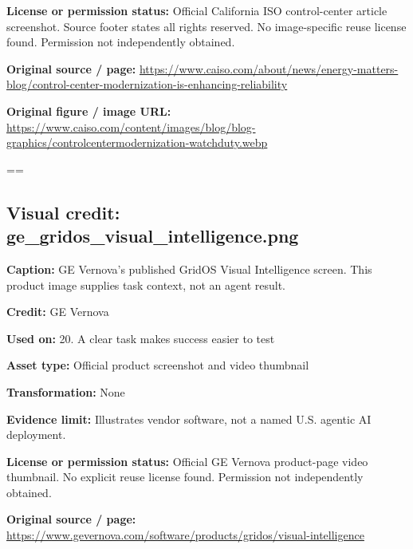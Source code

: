 \documentclass[10pt,letterpaper]{article}
\begin{document}
\textbf{License or permission status:} Official California ISO control-center article screenshot. Source footer states all rights reserved. No image-specific reuse license found. Permission not independently obtained.\par
\textbf{Original source / page:} \href{https://www.caiso.com/about/news/energy-matters-blog/control-center-modernization-is-enhancing-reliability}{\small\ttfamily https:/\allowbreak{}/\allowbreak{}www.\allowbreak{}caiso.\allowbreak{}com/\allowbreak{}about/\allowbreak{}news/\allowbreak{}energy-\allowbreak{}matters-\allowbreak{}blog/\allowbreak{}control-\allowbreak{}center-\allowbreak{}modernization-\allowbreak{}is-\allowbreak{}enhancing-\allowbreak{}reliability}\par
\textbf{Original figure / image URL:} \href{https://www.caiso.com/content/images/blog/blog-graphics/controlcentermodernization-watchduty.webp}{\small\ttfamily https:/\allowbreak{}/\allowbreak{}www.\allowbreak{}caiso.\allowbreak{}com/\allowbreak{}content/\allowbreak{}images/\allowbreak{}blog/\allowbreak{}blog-\allowbreak{}graphics/\allowbreak{}controlcentermodernization-\allowbreak{}watchduty.\allowbreak{}webp}\par
\egroup\par\noindent\box\readingEntry\par\medskip
\setbox\readingEntry=\vbox\bgroup\hsize=\linewidth\subsection*{Visual credit: ge\_gridos\_visual\_intelligence.png}
\textbf{Caption:} GE Vernova's published GridOS Visual Intelligence screen. This product image supplies task context, not an agent result.\par
\textbf{Credit:} GE Vernova\par
\textbf{Used on:} 20. A clear task makes success easier to test\par
\textbf{Asset type:} Official product screenshot and video thumbnail\par
\textbf{Transformation:} None\par
\textbf{Evidence limit:} Illustrates vendor software, not a named U.S. agentic AI deployment.\par
\textbf{License or permission status:} Official GE Vernova product-page video thumbnail. No explicit reuse license found. Permission not independently obtained.\par
\textbf{Original source / page:} \href{https://www.gevernova.com/software/products/gridos/visual-intelligence}{\small\ttfamily https:/\allowbreak{}/\allowbreak{}www.\allowbreak{}gevernova.\allowbreak{}com/\allowbreak{}software/\allowbreak{}products/\allowbreak{}gridos/\allowbreak{}visual-\allowbreak{}intelligence}\par
\end{document}
